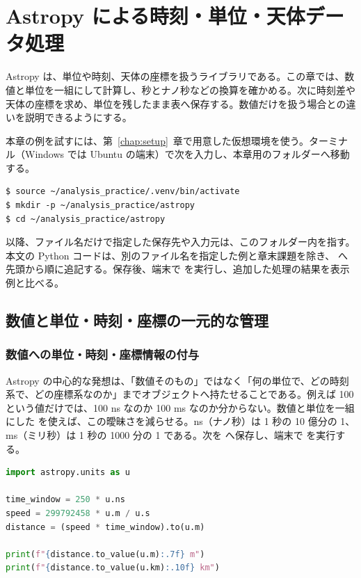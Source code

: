 \chapter{Astropy による時刻・単位・\mbox{天体データ処理}}
\label{chap:astropy}

Astropy は、単位や時刻、天体の座標を扱うライブラリである。この章では、数値と単位を一組にして計算し、秒とナノ秒などの換算を確かめる。次に時刻差や天体の座標を求め、単位を残したまま表へ保存する。数値だけを扱う場合との違いを説明できるようにする。

本章の例を試すには、第~\ref{chap:setup}~章で用意した仮想環境を使う。ターミナル（Windows では Ubuntu の端末）で次を入力し、本章用のフォルダーへ移動する。

\begin{lstlisting}[numbers=none, xleftmargin=2\zw]
$ source ~/analysis_practice/.venv/bin/activate
$ mkdir -p ~/analysis_practice/astropy
$ cd ~/analysis_practice/astropy
\end{lstlisting}

以降、ファイル名だけで指定した保存先や入力元は、このフォルダー内を指す。本文の Python コードは、別のファイル名を指定した例と章末課題を除き、 へ先頭から順に追記する。保存後、端末で  を実行し、追加した処理の結果を表示例と比べる。

\section{数値と単位・時刻・座標の一元的な管理}

\subsection{数値への単位・時刻・座標情報の付与}

Astropy の中心的な発想は、「数値そのもの」ではなく「何の単位で、どの時刻系で、どの座標系なのか」までオブジェクトへ持たせることである。例えば 100 という値だけでは、100 ns なのか 100 ms なのか分からない。数値と単位を一組にした  を使えば、この曖昧さを減らせる。ns（ナノ秒）は 1 秒の 10 億分の 1、ms（ミリ秒）は 1 秒の 1000 分の 1 である。次を  へ保存し、端末で  を実行する。

\begin{lstlisting}[language=Python]
import astropy.units as u

time_window = 250 * u.ns
speed = 299792458 * u.m / u.s
distance = (speed * time_window).to(u.m)

print(f"{distance.to_value(u.m):.7f} m")
print(f"{distance.to_value(u.km):.10f} km")
\end{lstlisting}

